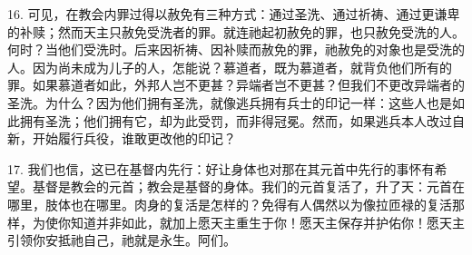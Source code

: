 16. 可见，在教会内罪过得以赦免有三种方式：通过圣洗、通过祈祷、通过更谦卑的补赎；然而天主只赦免受洗者的罪。就连祂起初赦免的罪，也只赦免受洗的人。何时？当他们受洗时。后来因祈祷、因补赎而赦免的罪，祂赦免的对象也是受洗的人。因为尚未成为儿子的人，怎能说？慕道者，既为慕道者，就背负他们所有的罪。如果慕道者如此，外邦人岂不更甚？异端者岂不更甚？但我们不更改异端者的圣洗。为什么？因为他们拥有圣洗，就像逃兵拥有兵士的印记一样：这些人也是如此拥有圣洗；他们拥有它，却为此受罚，而非得冠冕。然而，如果逃兵本人改过自新，开始履行兵役，谁敢更改他的印记？\par

17. 我们也信，这已在基督内先行：好让身体也对那在其元首中先行的事怀有希望。基督是教会的元首；教会是基督的身体。我们的元首复活了，升了天：元首在哪里，肢体也在哪里。肉身的复活是怎样的？免得有人偶然以为像拉匝禄的复活那样，为使你知道并非如此，就加上愿天主重生于你！愿天主保存并护佑你！愿天主引领你安抵祂自己，祂就是永生。阿们。\par

